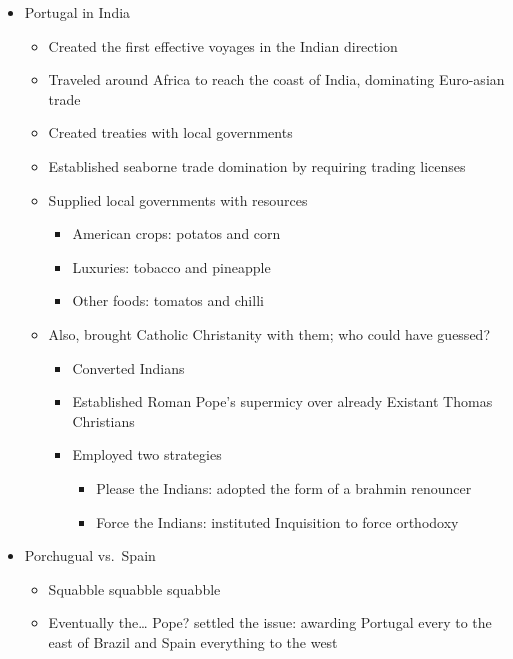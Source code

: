 \documentclass[letterpaper]{article}
\begin{document}
\begin{itemize}
\item Portugal in India

\begin{itemize}
\item Created the first effective voyages in the Indian direction
\item Traveled around Africa to reach the coast of India, dominating
Euro-asian trade
\item Created treaties with local governments
\item Established seaborne trade domination by requiring trading licenses
\item Supplied local governments with resources

\begin{itemize}
\item American crops: potatos and corn
\item Luxuries: tobacco and pineapple
\item Other foods: tomatos and chilli
\end{itemize}

\item Also, brought Catholic Christanity with them; who could have
guessed?

\begin{itemize}
\item Converted Indians
\item Established Roman Pope's supermicy over already Existant Thomas
Christians
\item Employed two strategies

\begin{itemize}
\item Please the Indians: adopted the form of a brahmin renouncer
\item Force the Indians: instituted Inquisition to force orthodoxy
\end{itemize}
\end{itemize}
\end{itemize}

\item Porchugual vs. Spain

\begin{itemize}
\item Squabble squabble squabble
\item Eventually the\ldots{} Pope? settled the issue: awarding Portugal every
to the east of Brazil and Spain everything to the west
\end{itemize}


\end{itemize}
\end{document}
